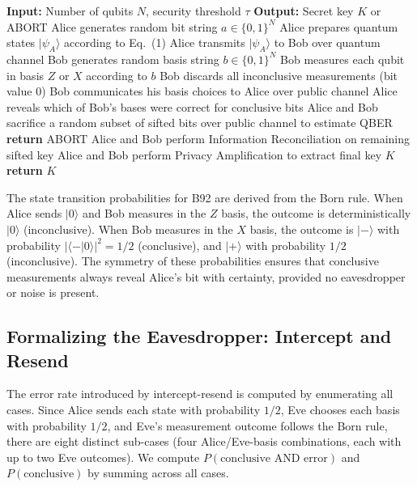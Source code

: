 \documentclass[conference]{IEEEtran}
\begin{document}
\begin{algorithm}[htbp]
\caption{B92 Quantum Key Distribution Protocol}
\label{alg:b92}
\begin{algorithmic}[1]
\State \textbf{Input:} Number of qubits $N$, security threshold $\tau$
\State \textbf{Output:} Secret key $K$ or ABORT
\State Alice generates random bit string $a \in \{0,1\}^N$
\State Alice prepares quantum states $|\psi_A\rangle$ according to Eq.~(1)
\State Alice transmits $|\psi_A\rangle$ to Bob over quantum channel
\State Bob generates random basis string $b \in \{0,1\}^N$
\State Bob measures each qubit in basis $Z$ or $X$ according to $b$
\State Bob discards all inconclusive measurements (bit value 0)
\State Bob communicates his basis choices to Alice over public channel
\State Alice reveals which of Bob's bases were correct for conclusive bits
\State Alice and Bob sacrifice a random subset of sifted bits over public channel to estimate QBER
    \State \textbf{return} ABORT 
\EndIf
\State Alice and Bob perform Information Reconciliation on remaining sifted key
\State Alice and Bob perform Privacy Amplification to extract final key $K$
\State \textbf{return} $K$
\end{algorithmic}
\end{algorithm}


The state transition probabilities for B92 are derived from the Born rule. When Alice sends $|0\rangle$ and Bob measures in the $Z$ basis, the outcome is deterministically $|0\rangle$ (inconclusive). When Bob measures in the $X$ basis, the outcome is $|-\rangle$ with probability $| \langle - | 0 \rangle |^2 = 1/2$ (conclusive), and $|+\rangle$ with probability $1/2$ (inconclusive). The symmetry of these probabilities ensures that conclusive measurements always reveal Alice's bit with certainty, provided no eavesdropper or noise is present.

\subsection{Formalizing the Eavesdropper: Intercept and Resend}

The error rate introduced by intercept-resend is computed by enumerating all cases. Since Alice sends each state with probability $1/2$, Eve chooses each basis with probability $1/2$, and Eve's measurement outcome follows the Born rule, there are eight distinct sub-cases (four Alice/Eve-basis combinations, each with up to two Eve outcomes). We compute $P(\text{conclusive AND error})$ and $P(\text{conclusive})$ by summing across all cases.
\end{document}
